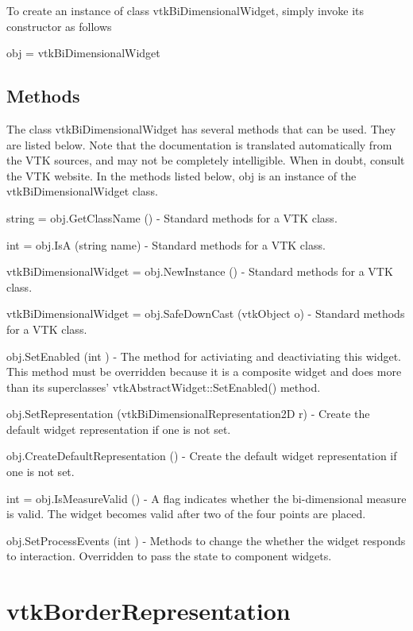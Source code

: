 To create an instance of class vtk\-Bi\-Dimensional\-Widget, simply invoke its constructor as follows \begin{DoxyVerb}  obj = vtkBiDimensionalWidget
\end{DoxyVerb}
 \hypertarget{vtkwidgets_vtkxyplotwidget_Methods}{}\subsection{Methods}\label{vtkwidgets_vtkxyplotwidget_Methods}
The class vtk\-Bi\-Dimensional\-Widget has several methods that can be used. They are listed below. Note that the documentation is translated automatically from the V\-T\-K sources, and may not be completely intelligible. When in doubt, consult the V\-T\-K website. In the methods listed below, {\ttfamily obj} is an instance of the vtk\-Bi\-Dimensional\-Widget class. 
\begin{DoxyItemize}
\item {\ttfamily string = obj.\-Get\-Class\-Name ()} -\/ Standard methods for a V\-T\-K class.  
\item {\ttfamily int = obj.\-Is\-A (string name)} -\/ Standard methods for a V\-T\-K class.  
\item {\ttfamily vtk\-Bi\-Dimensional\-Widget = obj.\-New\-Instance ()} -\/ Standard methods for a V\-T\-K class.  
\item {\ttfamily vtk\-Bi\-Dimensional\-Widget = obj.\-Safe\-Down\-Cast (vtk\-Object o)} -\/ Standard methods for a V\-T\-K class.  
\item {\ttfamily obj.\-Set\-Enabled (int )} -\/ The method for activiating and deactiviating this widget. This method must be overridden because it is a composite widget and does more than its superclasses' vtk\-Abstract\-Widget\-::\-Set\-Enabled() method.  
\item {\ttfamily obj.\-Set\-Representation (vtk\-Bi\-Dimensional\-Representation2\-D r)} -\/ Create the default widget representation if one is not set.  
\item {\ttfamily obj.\-Create\-Default\-Representation ()} -\/ Create the default widget representation if one is not set.  
\item {\ttfamily int = obj.\-Is\-Measure\-Valid ()} -\/ A flag indicates whether the bi-\/dimensional measure is valid. The widget becomes valid after two of the four points are placed.  
\item {\ttfamily obj.\-Set\-Process\-Events (int )} -\/ Methods to change the whether the widget responds to interaction. Overridden to pass the state to component widgets.  
\end{DoxyItemize}\hypertarget{vtkwidgets_vtkborderrepresentation}{}\section{vtk\-Border\-Representation}\label{vtkwidgets_vtkborderrepresentation}
